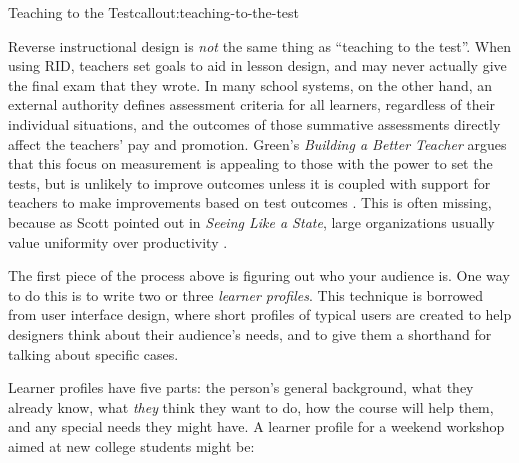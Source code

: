 \begin{callout}{Teaching to the Test}{callout:teaching-to-the-test}

Reverse instructional design is \emph{not} the same thing as
``teaching to the test''. When using RID, teachers set goals to aid in
lesson design, and may never actually give the final exam that they
wrote. In many school systems, on the other hand, an external
authority defines assessment criteria for all learners, regardless of
their individual situations, and the outcomes of those summative
assessments directly affect the teachers' pay and promotion.
Green's \emph{Building a Better Teacher} argues that this focus on
measurement is appealing to those with the power to set the tests, but
is unlikely to improve outcomes unless it is coupled with support for
teachers to make improvements based on test outcomes \cite{fixme}.
This is often missing, because as Scott pointed out in \emph{Seeing
Like a State}, large organizations usually value uniformity over
productivity \cite{fixme}.

\end{callout}


The first piece of the process above is figuring out who your audience
is.  One way to do this is to write two or three \emph{learner
profiles}. This technique is borrowed from user interface design,
where short profiles of typical users are created to help designers
think about their audience's needs, and to give them a shorthand for
talking about specific cases.

Learner profiles have five parts: the person's general background,
what they already know, what \emph{they} think they want to do, how
the course will help them, and any special needs they might have. A
learner profile for a weekend workshop aimed at new college students
might be:


